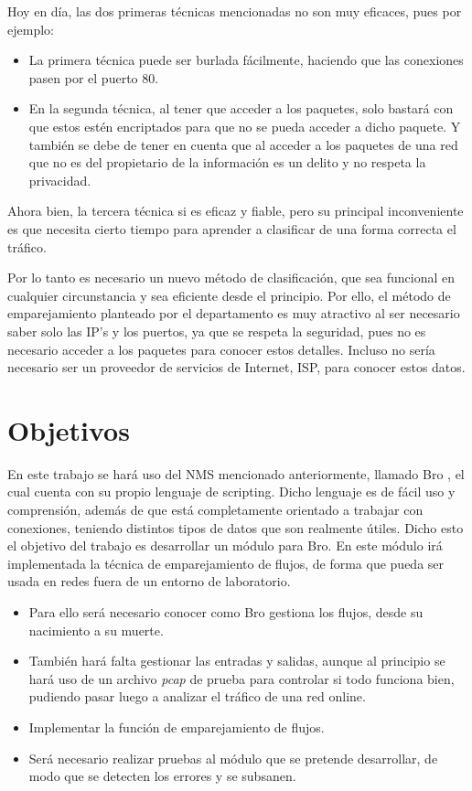Hoy en día, las dos primeras técnicas mencionadas no son muy eficaces, pues por ejemplo:
\begin{itemize}
\item La primera técnica puede ser burlada fácilmente, haciendo que las conexiones pasen por el puerto 80.
\item En la segunda técnica, al tener que acceder a los paquetes, solo bastará con que estos estén 
encriptados para que no se pueda acceder a dicho paquete. Y también se debe de tener en cuenta que 
al acceder a los paquetes de una red que no es del propietario de la información es un delito y no respeta 
la privacidad.
\end{itemize}
\intro Ahora bien, la tercera técnica si es eficaz y fiable, pero su principal inconveniente es que 
necesita cierto tiempo para aprender a clasificar de una forma correcta el tráfico.

\intro Por lo tanto es necesario un nuevo método de clasificación, que sea funcional en cualquier circunstancia 
y sea eficiente desde el principio. Por ello, el método de emparejamiento planteado por el 
departamento \cite{comparacion} es muy atractivo al ser necesario saber solo las IP's y los puertos, 
ya que se respeta la seguridad, pues no es necesario acceder a los paquetes para conocer estos detalles. Incluso 
no sería necesario ser un proveedor de servicios de Internet, ISP, para conocer estos datos.


\section{Objetivos}

En este trabajo se hará uso del NMS mencionado anteriormente, llamado Bro \cite{broindex}, el cual cuenta con 
su propio lenguaje de scripting. Dicho lenguaje es de fácil uso y comprensión, además de que está completamente 
orientado a trabajar con conexiones, teniendo distintos tipos de datos que son realmente útiles. Dicho esto 
el objetivo del trabajo es desarrollar un módulo para Bro. En este módulo irá implementada la 
técnica de emparejamiento de flujos, de forma que pueda ser usada en redes fuera de un entorno de laboratorio.

\begin{itemize}
\item Para ello será necesario conocer como Bro gestiona los flujos, desde su nacimiento a su muerte. 
\item También hará falta gestionar las entradas y salidas, aunque al principio se hará uso de un 
archivo \textit{pcap} de prueba para controlar si todo funciona bien, pudiendo pasar luego a analizar 
el tráfico de una red online.
\item Implementar la función de emparejamiento de flujos.
\item Será necesario realizar pruebas al módulo que se pretende desarrollar, de modo que se detecten los 
errores y se subsanen.
\end{itemize}

